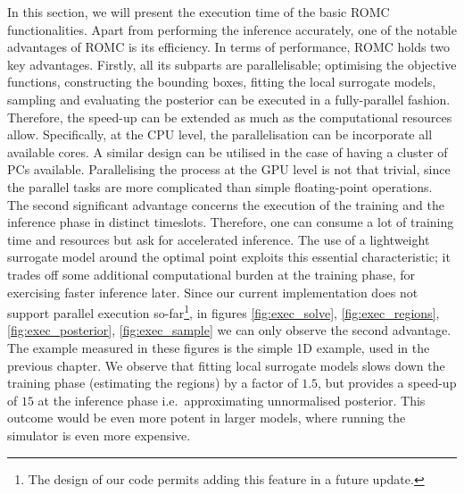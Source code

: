 In this section, we will present the execution time of the basic ROMC
functionalities. Apart from performing the inference accurately, one
of the notable advantages of ROMC is its efficiency. In terms of
performance, ROMC holds two key advantages. Firstly, all its subparts
are parallelisable; optimising the objective functions, constructing
the bounding boxes, fitting the local surrogate models, sampling and
evaluating the posterior can be executed in a fully-parallel
fashion. Therefore, the speed-up can be extended as much as the
computational resources allow. Specifically, at the CPU level, the
parallelisation can be incorporate all available cores. A similar
design can be utilised in the case of having a cluster of PCs
available. Parallelising the process at the GPU level is not that
trivial, since the parallel tasks are more complicated than simple
floating-point operations. The second significant advantage concerns
the execution of the training and the inference phase in distinct
timeslots. Therefore, one can consume a lot of training time and
resources but ask for accelerated inference. The use of a lightweight
surrogate model around the optimal point exploits this essential
characteristic; it trades off some additional computational burden at
the training phase, for exercising faster inference later. Since our
current implementation does not support parallel execution
so-far\footnote{The design of our code permits adding this feature in
  a future update.}, in figures \ref{fig:exec_solve},
\ref{fig:exec_regions}, \ref{fig:exec_posterior},
\ref{fig:exec_sample} we can only observe the second advantage. The
example measured in these figures is the simple 1D example, used in
the previous chapter. We observe that fitting local surrogate models
slows down the training phase (estimating the regions) by a factor of
$1.5$, but provides a speed-up of $15$ at the inference phase
i.e.\ approximating unnormalised posterior. This outcome would be
even more potent in larger models, where running the simulator is even
more expensive.



